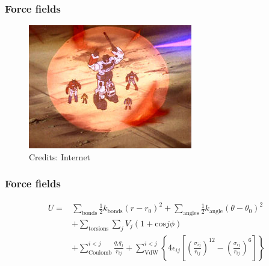 \documentclass{beamer}
\begin{document}
\begin{frame}\frametitle{Force fields}

\begin{figure}
\includegraphics[scale=1.481]{transformer-forcefield.jpg}
\caption{{\scriptsize Credits: Internet}}
\end{figure}

\end{frame}

\begin{frame}\frametitle{Force fields}

\begin{equation}
\begin{aligned}
	U  = & \sum_{\textrm{bonds}} \frac{1}{2} k_{\textrm{bonds}} (r-r_0)^2 + \sum_{\textrm{angles}} \frac{1}{2} k_{\textrm{angle}} 
	(\theta-\theta_0)^2 \\
	&+\sum_{\textrm{torsions}} \sum_j V_j(1+\textrm{cos}j\phi)  \\
 &+ \sum_{\textrm{Coulomb}}^{i<j} \frac{q_i q_j}{r_{ij}}  +  \sum_{\textrm{VdW}}^{i<j} 
\left\{ 4\epsilon_{ij} \left[ \left( \frac{\sigma_{ij}}{r_{ij}} \right)^{12}-  \left( \frac{\sigma_{ij}}{r_{ij}} \right)^{6} \right]  \right\}
\end{aligned}
\end{equation}


\end{frame}
\end{document}
